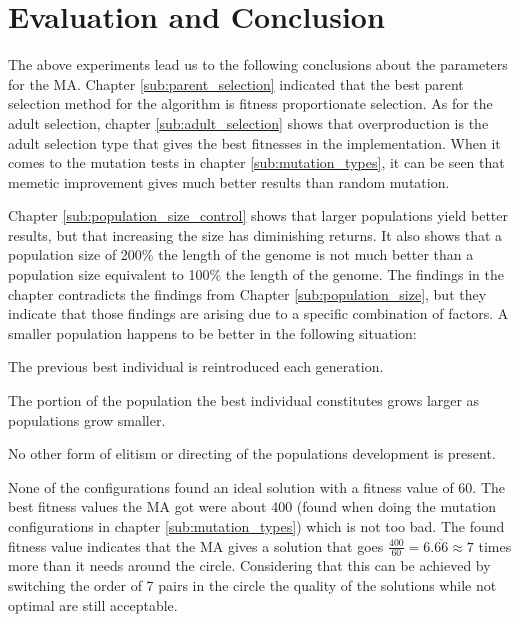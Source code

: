 

\section{Evaluation and Conclusion} %
\label{sec:evaluation_and_conclusion}

The above experiments lead us to the following conclusions about the parameters for the MA. Chapter \ref{sub:parent_selection} indicated that the best parent selection method for the algorithm is fitness proportionate selection. As for the adult selection, chapter \ref{sub:adult_selection} shows that overproduction is the adult selection type that gives the best fitnesses in the implementation. When it comes to the mutation tests in chapter \ref{sub:mutation_types}, it can be seen that memetic improvement gives much better results than random mutation.

Chapter \ref{sub:population_size_control} shows that larger populations yield better results, but that increasing the size has diminishing returns. It also shows that a population size of 200\% the length of the genome is not much better than a population size equivalent to 100\% the length of the genome. The findings in the chapter contradicts the findings from Chapter \ref{sub:population_size}, but they indicate that those findings are arising due to a specific combination of factors. A smaller population happens to be better in the following situation:

\begin{compactitem}
    \item The previous best individual is reintroduced each generation.
    \item The portion of the population the best individual constitutes grows larger as populations grow smaller.
    \item No other form of elitism or directing of the populations development is present.
\end{compactitem}

None of the configurations found an ideal solution with a fitness value of 60. The best fitness values the MA got were about 400 (found when doing the mutation configurations in chapter \ref{sub:mutation_types}) which is not too bad. The found fitness value indicates that the MA gives a solution that goes $\frac{400}{60} = 6.\overline{66} \approx 7$ times more than it needs around the circle. Considering that this can be achieved by switching the order of 7 pairs in the circle the quality of the solutions while not optimal are still acceptable.

